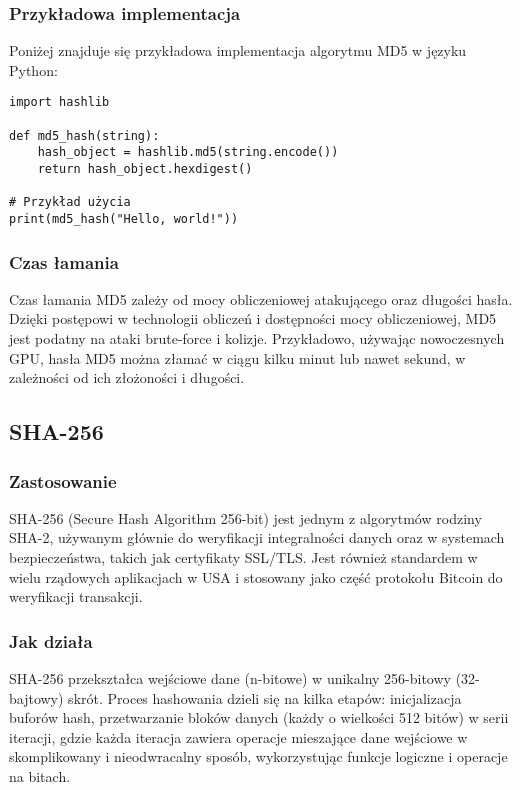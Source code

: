 \documentclass[12pt,a4paper]{article}
\begin{document}
\subsubsection{Przykładowa implementacja}
Poniżej znajduje się przykładowa implementacja algorytmu MD5 w języku Python:

\begin{verbatim}
import hashlib

def md5_hash(string):
    hash_object = hashlib.md5(string.encode())
    return hash_object.hexdigest()

# Przykład użycia
print(md5_hash("Hello, world!"))
\end{verbatim}

\subsubsection{Czas łamania}
Czas łamania MD5 zależy od mocy obliczeniowej atakującego oraz długości hasła. Dzięki postępowi w technologii obliczeń i dostępności mocy obliczeniowej, MD5 jest podatny na ataki brute-force i kolizje. Przykładowo, używając nowoczesnych GPU, hasła MD5 można złamać w ciągu kilku minut lub nawet sekund, w zależności od ich złożoności i długości.

\subsection{SHA-256}
\subsubsection{Zastosowanie}
SHA-256 (Secure Hash Algorithm 256-bit) jest jednym z algorytmów rodziny SHA-2, używanym głównie do weryfikacji integralności danych oraz w systemach bezpieczeństwa, takich jak certyfikaty SSL/TLS. Jest również standardem w wielu rządowych aplikacjach w USA i stosowany jako część protokołu Bitcoin do weryfikacji transakcji.

\subsubsection{Jak działa}
SHA-256 przekształca wejściowe dane (n-bitowe) w unikalny 256-bitowy (32-bajtowy) skrót. Proces hashowania dzieli się na kilka etapów: inicjalizacja buforów hash, przetwarzanie bloków danych (każdy o wielkości 512 bitów) w serii iteracji, gdzie każda iteracja zawiera operacje mieszające dane wejściowe w skomplikowany i nieodwracalny sposób, wykorzystując funkcje logiczne i operacje na bitach.
\end{document}
